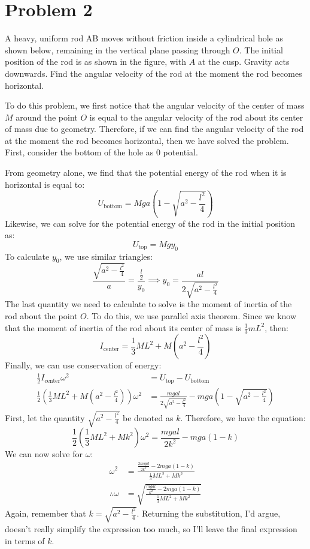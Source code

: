 \documentclass[10pt]{article}
\begin{document}
	\pagebreak

	\section*{Problem 2}
	A heavy, uniform rod AB moves without friction inside a cylindrical hole as shown below, remaining in the 
	vertical plane passing through $O$. The initial position of the rod is as shown in the figure, with $A$ at 
	the cusp. Gravity acts downwards. Find the angular velocity of the rod at the moment the rod becomes 
	horizontal. 

	\begin{solution}
		To do this problem, we first notice that the angular velocity of the center of mass $M$ around the point
		$O$ is equal to the angular velocity of the rod about its center of mass due to geometry. Therefore, 
		if we can find the angular velocity of the rod at the moment the rod becomes horizontal, then we 
		have solved the problem. First, consider the bottom of the hole as 0 potential. 

		From geometry alone, we find that the potential energy of the rod when it is horizontal is equal to:
		\[
			U_{\text{bottom}} = Mga\left(1 - \sqrt{a^2 - \frac{l^2}{4}}\right)
		\] 
		Likewise, we can solve for the potential energy of the rod in the initial position as:
		\[
			U_{\text{top}} = Mgy_0
		\] 
		To calculate $y_0$, we use similar triangles:
		\[
			\frac{\sqrt{a^2 - \frac{l^2}{4}} }{a} = \frac{\frac{l}{2}}{y_0} \implies y_0 = \frac{al}{2\sqrt{
			a^2 - \frac{l^2}{4}} }
		\] 
		The last quantity we need to calculate to solve is the moment of inertia of the rod about the point $O$.
		To do this, we use parallel axis theorem. Since we know that the moment of inertia of the rod about 
		its center of mass is $\frac{1}{3} mL^2$, then:
		\[
			I_{\text{center}} = \frac{1}{3}ML^2 + M\left( a^2 - \frac{l^2}{4} \right) 
		\] 
		Finally, we can use conservation of energy:
		\begin{align*}
			\frac{1}{2}I_{\text{center}} \omega^2 &= U_{\text{top}} - U_{\text{bottom}}\\
			\frac{1}{2}\left( \frac{1}{3}ML^2 + M\left( a^2 - \frac{l^2}{4} \right)  \right) \omega^2 &= \frac{mgal}{2\sqrt{a^2 - \frac{l^2}{4}} } - mga\left( 1 - \sqrt{a^2 - \frac{l^2}{4}}  \right)
		\end{align*}
		First, let the quantity $\sqrt{a^2 - \frac{l^2}{4}}$ be denoted as $k$. Therefore, we have the equation:
		\[
		\frac{1}{2}\left( \frac{1}{3}ML^2 + Mk^2  \right)\omega^2 = \frac{mgal}{2k^2} - mga(1 - k)
		\] 
		We can now solve for $\omega$:
		\begin{align*}
			\omega^2 &= \frac{\frac{2mgal}{2k^2} - 2mga(1 - k)}{\frac{1}{3}ML^2 + Mk^2} \\
			\therefore \omega &= \sqrt{\frac{\frac{mgal}{k^2} - 2mga(1-k)}{\frac{1}{3}ML^2 + Mk^2}} 
		\end{align*}
		Again, remember that $k = \sqrt{a^2 - \frac{l^2}{4}}$. Returning the substitution, I'd argue, doesn't
		really simplify the expression too much, so I'll leave the final expression in terms of $k$.
	\end{solution}
\end{document}
